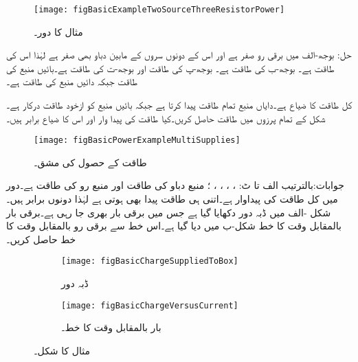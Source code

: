 \begin{figure}
\centering
\texttt{[image: figBasicExampleTwoSourceThreeResistorPower]}
\caption{مثال  کا دور۔}
\label{شکل_بنیادی_طاقت_حساب_مثال}
\end{figure}

حل: بوجھ-الف میں برقی رو صفر ہے اور اس کے دونوں سروں کے مابین دباو بھی صفر ہے لہٰذا اس کی طاقت  ہے۔ بوجھ-ب کی  طاقت  ہے۔ بوجھ-پ کی طاقت  اور بوجھ-ت کی طاقت  ہے۔بائیں منبع کی طاقت  جبکہ دائیں منبع کی طاقت  ہے۔

کل طاقت کا ضیاع   ہے۔دایاں منبع تمام طاقت پیدا کرتا ہے جبکہ بائیں منبع  کو ازخود طاقت درکار ہے۔ 
شکل  کے تمام پرزوں میں طاقت حاصل کریں۔کیا طاقت کی پیدا وار اور اس کا ضیاع برابر ہیں۔

\begin{figure}
\centering
\texttt{[image: figBasicPowerExampleMultiSupplies]}
\caption{طاقت کے حصول کی مشق۔}
\label{شکل_بنیادی_طاقت_حصول_مشق}
\end{figure}

جوابات:بالترتیب الف تا ٹ: ، ، ، ، ؛ منبع دباو کی طاقت  اور منبع رو کی طاقت  ہے۔دور میں کل طاقت کی پیداوار  ہے۔اتنی ہی طاقت پیدا بھی ہوتی ہے لہٰذا دونوں برابر ہیں۔
شکل -الف میں ڈبہ دور دکھایا گیا ہے جس میں برقی بار بھری جا رہی ہے۔برقی بار بالمقابل وقت کا خط شکل-ب میں دیا گیا ہے۔اس خط سے برقی رو بالمقابل وقت کا خط حاصل کریں۔

\begin{figure}
\centering
\begin{subfigure}{0.5\textwidth}
\centering
\texttt{[image: figBasicChargeSuppliedToBox]}
\caption{ڈبہ دور}
\end{subfigure}%
%
\begin{subfigure}{0.5\textwidth}
\centering
\texttt{[image: figBasicChargeVersusCurrent]}
\caption{بار بالمقابل وقت کا خط۔}
\end{subfigure}%
\caption{مثال  کا شکل۔}
\label{شکل_بنیادی_بار_بالمقابل_وقت}
\end{figure}

